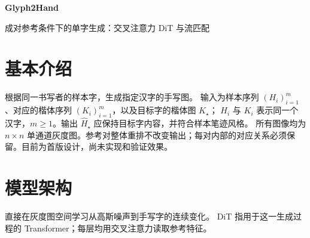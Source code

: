 \documentclass[UTF8,fontset=fandol,zihao=5,a4paper]{ctexart}
\begin{document}
\begin{center}
  {\LARGE\bfseries Glyph2Hand}\par
  \vspace{2pt}
  {\normalsize 成对参考条件下的单字生成：交叉注意力 DiT 与流匹配}
\end{center}

\section{基本介绍}
根据同一书写者的样本字，生成指定汉字的手写图。
输入为样本序列 $(H_i)_{i=1}^m$、对应的楷体序列 $(K_i)_{i=1}^m$，以及目标字的楷体图 $K_\star$；
$H_i$ 与 $K_i$ 表示同一个汉字，$m\geq1$。输出 $\widehat H_\star$ 应保持目标字内容，并符合样本笔迹风格。
所有图像均为 $n\times n$ 单通道灰度图。参考对整体重排不改变输出；每对内部的对应关系必须保留。目前为首版设计，尚未实现和验证效果。

\section{模型架构}
直接在灰度图空间学习从高斯噪声到手写字的连续变化。
DiT 指用于这一生成过程的 Transformer；每层均用交叉注意力读取参考特征。
\end{document}
